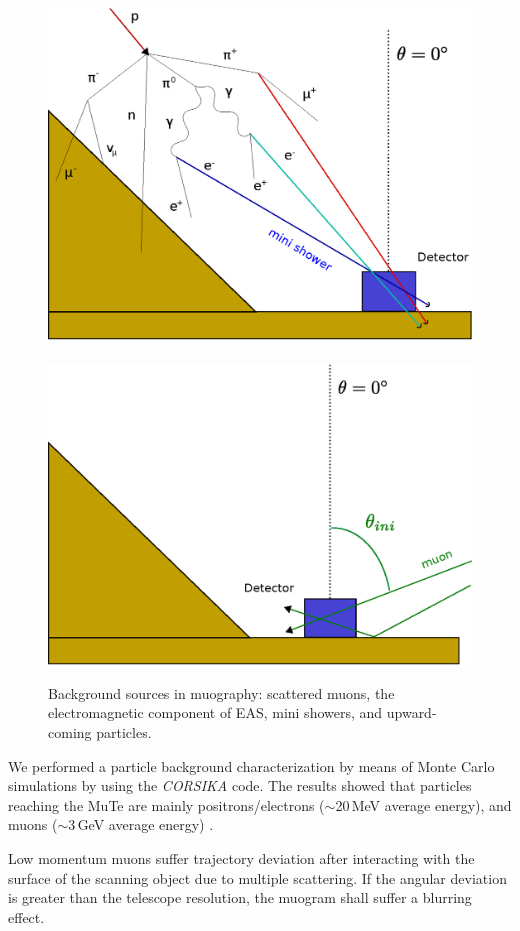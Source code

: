 \documentclass{PoS}
\begin{document}
\begin{figure}[!h]
\includegraphics[scale=0.35]{Figures/Multi.eps} \ \ \
\includegraphics[scale=0.35]{Figures/Albedo.eps}
\caption{Background sources in muography: scattered muons, the electromagnetic component of EAS, mini showers, and upward-coming particles.}
\label{Noise}
\end{figure}

We performed a particle background characterization by means of Monte Carlo simulations by using the \textsl{CORSIKA} code. The results showed that particles reaching the MuTe are mainly positrons/electrons ($\sim$20\,MeV average energy), and muons ($\sim$3\,GeV average energy) \cite{VasquezRamirezEtal2020}.

Low momentum muons suffer trajectory deviation after interacting with the surface of the scanning object due to multiple scattering. If the angular deviation is greater than the telescope resolution, the muogram shall suffer a blurring effect.
\end{document}

